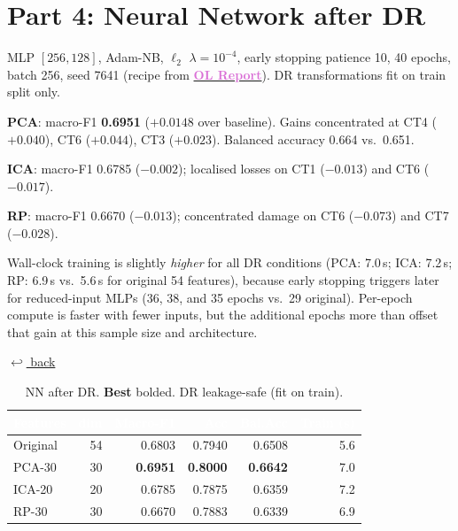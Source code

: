 \documentclass[conference]{IEEEtran}
\newcommand{\OLref}{\href{https://www.dropbox.com/scl/fi/nizvo97qjzh17yvg8tfx9/OL_Report_tleung37.pdf?rlkey=1e7489vvcymvtchtae00oury4&st=zgtxzg6s&dl=0}{\textcolor{orchid}{\textbf{OL Report}}}}
\newcommand{\Ltwo}{$\ell_2$}
\newcommand{\backto}[1]{\hfill\hyperref[#1]{\textcolor{denimmid}{\footnotesize $\hookleftarrow$ back}}}
\begin{document}
{\section{Part 4: Neural Network after DR}\label{sec:p4}

MLP $[256,128]$, Adam-NB, \Ltwo{} $\lambda{=}10^{-4}$, early stopping
patience 10, 40 epochs, batch 256, seed 7641 (recipe from \OLref{}).
DR transformations fit on train split only.

\textbf{PCA}: macro-F1 \textbf{0.6951} ($+0.0148$ over baseline).
Gains concentrated at CT4 ($+0.040$), CT6 ($+0.044$), CT3 ($+0.023$).
Balanced accuracy 0.664 vs.\ 0.651.

\textbf{ICA}: macro-F1 0.6785 ($-0.002$); localised losses on
CT1 ($-0.013$) and CT6 ($-0.017$).

\textbf{RP}: macro-F1 0.6670 ($-0.013$); concentrated damage on
CT6 ($-0.073$) and CT7 ($-0.028$).

Wall-clock training is slightly \emph{higher} for all DR conditions
(PCA: 7.0\,s; ICA: 7.2\,s; RP: 6.9\,s vs.\ 5.6\,s for original 54 features),
because early stopping triggers later for reduced-input MLPs
(36, 38, and 35 epochs vs.\ 29 original).
Per-epoch compute is faster with fewer inputs, but the additional epochs
more than offset that gain at this sample size and architecture.

\begin{table}[!t]
\caption{NN after DR. \textbf{Best} bolded. DR leakage-safe (fit on train).}
\label{tab:nn_dr}\backto{sec:p4}
\centering\small
{}
\begin{tabular}{lrrrrr}
\toprule
\rowcolor{denimdark}
\textcolor{white}{\textbf{Features}} & \textcolor{white}{\textbf{dim}} &
\textcolor{white}{\textbf{Macro-F1}} & \textcolor{white}{\textbf{Acc}} &
\textcolor{white}{\textbf{Bal.Acc}} & \textcolor{white}{\textbf{Train (s)}} \\
\midrule
Original & 54 & 0.6803 & 0.7940 & 0.6508 & 5.6 \\
PCA-30   & 30 & \textbf{0.6951} & \textbf{0.8000} & \textbf{0.6642} & 7.0 \\
ICA-20   & 20 & 0.6785 & 0.7875 & 0.6359 & 7.2 \\
RP-30    & 30 & 0.6670 & 0.7883 & 0.6339 & 6.9 \\
\bottomrule
\end{tabular}
\end{table}

}
\end{document}
